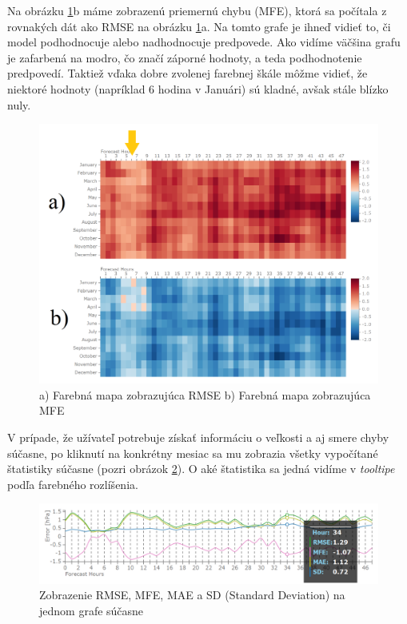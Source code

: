 Na obrázku \ref{fig:overview}b máme zobrazenú priemernú chybu (MFE), ktorá sa počítala z rovnakých dát ako RMSE na obrázku \ref{fig:overview}a. Na tomto grafe je ihneď vidieť to, či model podhodnocuje alebo nadhodnocuje predpovede. Ako vidíme väčšina grafu je zafarbená na modro, čo značí záporné hodnoty, a teda podhodnotenie predpovedí. Taktiež vďaka dobre zvolenej farebnej škále môžme vidieť, že niektoré hodnoty (napríklad 6 hodina v Januári) sú kladné, avšak stále blízko nuly.

\begin{figure}
	\centering
	\includegraphics[width = 5in]{overview}
	\caption{a) Farebná mapa zobrazujúca RMSE b) Farebná mapa zobrazujúca MFE}
	\label{fig:overview} 
\end{figure}

V prípade, že užívateľ potrebuje získať informáciu o veľkosti a aj smere chyby súčasne, po kliknutí na konkrétny mesiac sa mu zobrazia všetky vypočítané štatistiky súčasne (pozri obrázok \ref{fig:detail}). O aké štatistika sa jedná vidíme v \textit{tooltipe} podľa farebného rozlíšenia.

\begin{figure}
	\centering
	\includegraphics[width = 6in]{detail}
	\caption{Zobrazenie RMSE, MFE, MAE a SD (Standard Deviation) na jednom grafe súčasne}
	\label{fig:detail} 
\end{figure}


